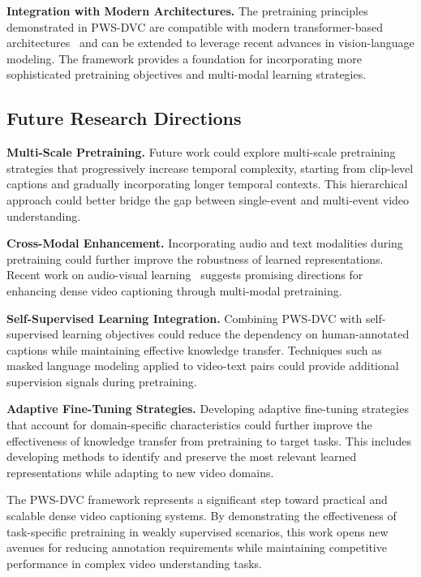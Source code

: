 \textbf{Integration with Modern Architectures.}
The pretraining principles demonstrated in PWS-DVC are compatible with modern transformer-based architectures~\cite{Vaswani2017-sc} and can be extended to leverage recent advances in vision-language modeling. The framework provides a foundation for incorporating more sophisticated pretraining objectives and multi-modal learning strategies.

\subsection{Future Research Directions}

\textbf{Multi-Scale Pretraining.}
Future work could explore multi-scale pretraining strategies that progressively increase temporal complexity, starting from clip-level captions and gradually incorporating longer temporal contexts. This hierarchical approach could better bridge the gap between single-event and multi-event video understanding.

\textbf{Cross-Modal Enhancement.}
Incorporating audio and text modalities during pretraining could further improve the robustness of learned representations. Recent work on audio-visual learning~\cite{Akbari2021-ih} suggests promising directions for enhancing dense video captioning through multi-modal pretraining.

\textbf{Self-Supervised Learning Integration.}
Combining PWS-DVC with self-supervised learning objectives could reduce the dependency on human-annotated captions while maintaining effective knowledge transfer. Techniques such as masked language modeling applied to video-text pairs could provide additional supervision signals during pretraining.

\textbf{Adaptive Fine-Tuning Strategies.}
Developing adaptive fine-tuning strategies that account for domain-specific characteristics could further improve the effectiveness of knowledge transfer from pretraining to target tasks. This includes developing methods to identify and preserve the most relevant learned representations while adapting to new video domains.

The PWS-DVC framework represents a significant step toward practical and scalable dense video captioning systems. By demonstrating the effectiveness of task-specific pretraining in weakly supervised scenarios, this work opens new avenues for reducing annotation requirements while maintaining competitive performance in complex video understanding tasks.